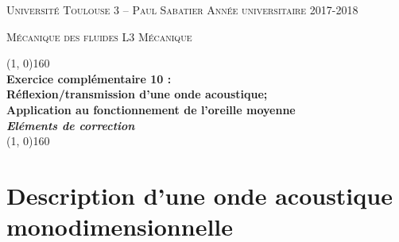 \documentclass[10pt, a4paper]{article}
\renewcommand{\thickline}[2]{\linethickness{#1} \line(1, 0){#2}}
\begin{document}

\begin{center}

  \textsc{Université Toulouse 3 -- Paul Sabatier \hfill Année universitaire 2017-2018}
  
  \textsc{Mécanique des fluides \hfill L3 Mécanique}
  
  \vspace{0mm}
  
  \begin{center}
    \thickline{0.4mm}{160}
    \\ \vspace{3mm}
  \textbf{\large Exercice complémentaire 10 : 
  \\
  Réflexion/transmission d'une onde acoustique;  \\
  Application au fonctionnement de l'oreille moyenne\\
  {\em Eléments de correction}
  }
    \\ %
    \thickline{0.4mm}{160}
  \end{center}

  
\end{center}

\section{Description d'une onde acoustique monodimensionnelle}
\end{document}
